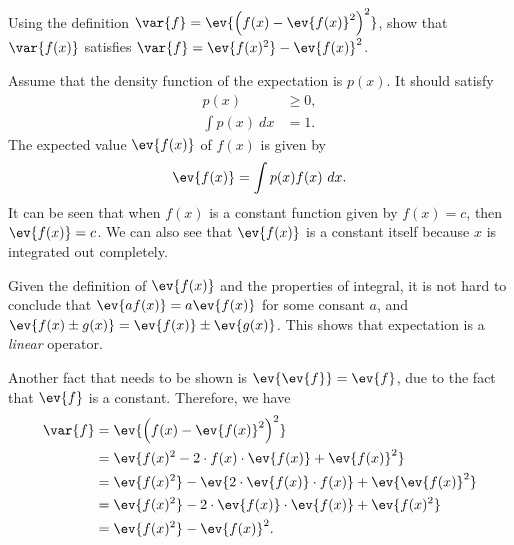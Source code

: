 \begin{question}{1.5}
	Using the definition $\var{f} = \ev{\left(f(x) - \ev{f(x)}^2\right)^2}$, show that $\var{f(x)}$ satisfies $\var{f} = \ev{f(x)^2} - \ev{f(x)}^2$.
\end{question}

\begin{answer}{}
	Assume that the density function of the expectation is $p(x)$. It should satisfy
	\begin{align}
		p(x) &\geq 0,\\
		\int p(x)\ dx &= 1.
	\end{align}
	The expected value $\ev{f(x)}$ of $f(x)$ is given by
	\begin{align}
		\ev{f(x)} = \int p(x)f(x)\ dx.
	\end{align}
	It can be seen that when $f(x)$ is a constant function given by $f(x) = c$, then $\ev{f(x)} = c$. We can also see that $\ev{f(x)}$ is a constant itself because $x$ is integrated out completely. 
	
	Given the definition of $\ev{f(x)}$ and the properties of integral, it is not hard to conclude that $\ev{af(x)} = a\ev{f(x)}$ for some consant $a$, and $\ev{f(x) \pm g(x)} = \ev{f(x)} \pm \ev{g(x)}$. This shows that expectation is a \emph{linear} operator.
	
	Another fact that needs to be shown is $\ev{\ev{f}} = \ev{f}$, due to the fact that $\ev{f}$ is a constant. Therefore, we have
	\begin{align}
		\var{f} &= \ev{\left(f(x) - \ev{f(x)}^2\right)^2}\\
		&= \ev{f(x)^2 - 2\cdot f(x) \cdot \ev{f(x)} + \ev{f(x)}^2}\\
		&= \ev{f(x)^2} - \ev{2\cdot\ev{f(x)}\cdot f(x)} + \ev{\ev{f(x)}^2}\\
		&= \ev{f(x)^2} -2\cdot\ev{f(x)} \cdot \ev{f(x)} + \ev{f(x)^2}\\
		&= \ev{f(x)^2} - \ev{f(x)}^2.
	\end{align}
\end{answer}